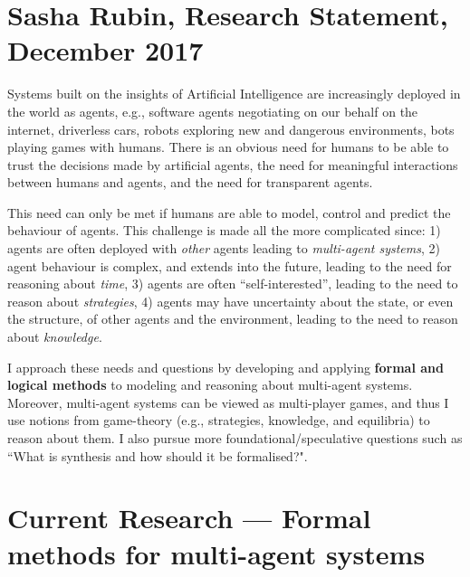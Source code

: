 \documentclass[a4paper,10pt]{scrartcl}
\begin{document}

\section*{Sasha Rubin, Research Statement, December 2017}
Systems built on the insights of Artificial Intelligence are increasingly deployed in
the world as agents, e.g., software agents negotiating on our behalf on the internet, driverless cars, robots
exploring new and dangerous environments, bots playing games with humans. There is an obvious need
for humans to be able to trust the decisions made by artificial agents, the need for meaningful interactions
between humans and agents, and the need for transparent agents.

This need can only be met if humans are able to model, control and predict the {behaviour} of agents. This challenge is made 
all the more complicated since: 1) agents are often deployed with \emph{other} agents leading to \emph{multi-agent systems}, 2) agent behaviour is complex, and extends into the future, leading to the need for reasoning about \emph{time}, 3)  agents are often ``self-interested'', leading to the need to reason about \emph{strategies}, 4)
agents may have uncertainty about the state, or even the structure, of other agents and the environment, leading to the need to reason about \emph{knowledge}.
 

I approach these needs and questions by developing and applying \textbf{formal and logical methods} to modeling and reasoning about multi-agent systems. Moreover, 
multi-agent systems can be viewed as multi-player games, and thus I use notions from game-theory (e.g., strategies, knowledge, and equilibria) to reason about them. 
I also pursue more foundational/speculative questions such as ``What is synthesis and how should it be formalised?".



\section{Current Research --- Formal methods for multi-agent systems}
\end{document}
